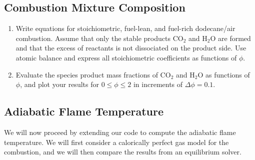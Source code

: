\documentclass[11pt]{article}
\begin{document}
\subsection{Combustion Mixture Composition}
\begin{enumerate}[label=(\alph*)]
	\item
    	Write equations for stoichiometric, fuel-lean, and fuel-rich dodecane/air combustion.  Assume that only the stable products $\mathrm{CO_2}$ and $\mathrm{H_2O}$ are formed and that the excess of reactants is not dissociated on the product side.  Use atomic balance and express all stoichiometric coefficients as functions of $\phi$.
    \item
    	Evaluate the species product mass fractions of $\mathrm{CO_2}$ and $\mathrm{H_2O}$ as functions of $\phi$, and plot your results for $0 \le \phi \le 2$ in increments of $\Delta \phi =0.1$.
\end{enumerate}
\subsection{Adiabatic Flame Temperature}
We will now proceed by extending our code to compute the adiabatic flame temperature.  We will first consider a calorically perfect gas model for the combustion, and we will then compare the results from an equilibrium solver.
\end{document}
